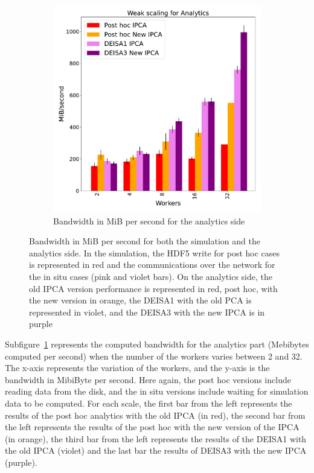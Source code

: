\begin{figure}[hb]
\begin{subfigure}[b]{0.45\textwidth}
         \includegraphics[width=\textwidth, height=\textwidth]{figures/A_1vs3vspost1vspost2.pdf}
         \caption{Bandwidth in MiB per second for the analytics side}
         \label{fig:A}
     \end{subfigure}
        \caption{Bandwidth in MiB per second for both the simulation and the analytics side. In the simulation, the HDF5 write for post hoc cases is represented in red and the communications over the network for the in situ cases (pink and violet bars). On the analytics side, the old IPCA version performance is represented in red, post hoc, with the new version in orange, the DEISA1 with the old PCA is represented in violet, and the DEISA3 with the new IPCA is in purple}
        \label{fig:perf_procs_variability}
\end{figure}

Subfigure~\ref{fig:A} represents the computed bandwidth for the analytics part (Mebibytes computed per second) when the number of the \dask workers varies between 2 and 32.
The x-axis represents the variation of the \dask workers, and the y-axis is the bandwidth in MibiByte per second. Here again, the post hoc versions include reading data from the disk, and the in situ versions include waiting for simulation data to be computed.
For each scale, the first bar from the left represents the results of the post hoc analytics with the old IPCA (in red), the second bar from the left represents the results of the post hoc with the new version of the IPCA (in orange), the third bar from the left represents the results of the DEISA1 with the old IPCA (violet) and the last bar the results of DEISA3 with the new IPCA (purple).  


